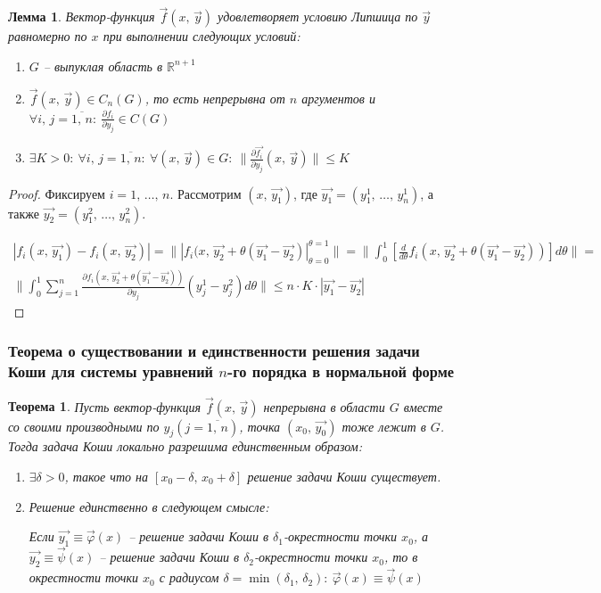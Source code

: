 \documentclass[a4paper,12pt]{article}
\renewcommand{\phi}{\ensuremath{\varphi}}
\renewcommand{\leq}{\ensuremath{\leqslant}}
\theoremstyle{plain}
\newtheorem{theorem}{Теорема}[section]
\newtheorem{lemma}{Лемма}[section]
\theoremstyle{definition}
\theoremstyle{remark}
\begin{document}
\begin{lemma}
	Вектор-функция $\vec{f}(x,\,\vec{y})$ удовлетворяет условию Липшица по $\vec{y}$ равномерно по $x$ при выполнении следующих условий:

	\begin{enumerate}
		\item $G$ -- выпуклая область в $\mathbb{R}^{n + 1}$
		\item $\vec{f}(x,\,\vec{y}) \in C_n(G)$, то есть непрерывна от $n$ аргументов и $\forall i,\, j = \overline{1,\,n}:\: \frac{\partial f_i}{\partial y_j} \in C(G)$
		\item $\exists K > 0:\: \forall i,\,j = \overline{1,\,n}:\: \forall (x,\, \vec{y}) \in G:\: \|\frac{\partial \vec{f_i}}{\partial y_j}(x,\,\vec{y})\| \leq K$
	\end{enumerate}
\end{lemma}

\begin{proof}
	Фиксируем $i = 1,\,\ldots,\,n$. Рассмотрим $(x,\, \vec{y_1})$, где $\vec{y_1} = (y_1^1,\,\ldots,\,y_n^1)$, а также $\vec{y_2} = (y_1^2,\,\ldots,\,y_n^2)$.

	\begin{align*}
		|f_i(x,\,\vec{y_1}) - f_i(x,\,\vec{y_2})| = \||f_i(x,\, \vec{y_2} + \theta(\vec{y_1} - \vec{y_2})|_{\theta = 0}^{\theta = 1}\| = \|\int_0^1 \left[\frac{d}{d\theta}f_i(x,\,\vec{y_2} + \theta(\vec{y_1} - \vec{y_2}))\right]d\theta\| = \\
		\|\int_0^1 \sum_{j = 1}^n \frac{\partial f_i(x,\, \vec{y_2} + \theta(\vec{y_1} - \vec{y_2}))}{\partial y_j}(y^1_j - y^2_j)d\theta\| \leq n \cdot K \cdot |\vec{y_1} - \vec{y_2}|
	\end{align*}
\end{proof}

\subsubsection*{Теорема о существовании и единственности решения задачи Коши для системы уравнений $n$-го порядка в нормальной форме}

\begin{theorem}
	Пусть вектор-функция $\vec{f}(x,\, \vec{y})$ непрерывна в области $G$ вместе со своими производными по $y_j (j = \overline{1,\,n})$, точка $(x_0,\, \vec{y_0})$ тоже лежит в $G$. Тогда задача Коши локально разрешима единственным образом:
	\begin{enumerate}
		\item $\exists \delta > 0$, такое что на $[x_0 - \delta,\, x_0 + \delta]$ решение задачи Коши существует.
		\item Решение единственно в следующем смысле:

		      Если $\vec{y_1} \equiv \vec{\phi}(x)$ -- решение задачи Коши в $\delta_1$-окрестности точки $x_0$, а $\vec{y_2} \equiv \vec{\psi}(x)$ -- решение задачи Коши в $\delta_2$-окрестности точки $x_0$, то в окрестности точки $x_0$ с радиусом $\delta = \min(\delta_1,\,\delta_2):\: \vec{\phi}(x) \equiv \vec{\psi}(x)$
	\end{enumerate}
\end{theorem}
\end{document}

